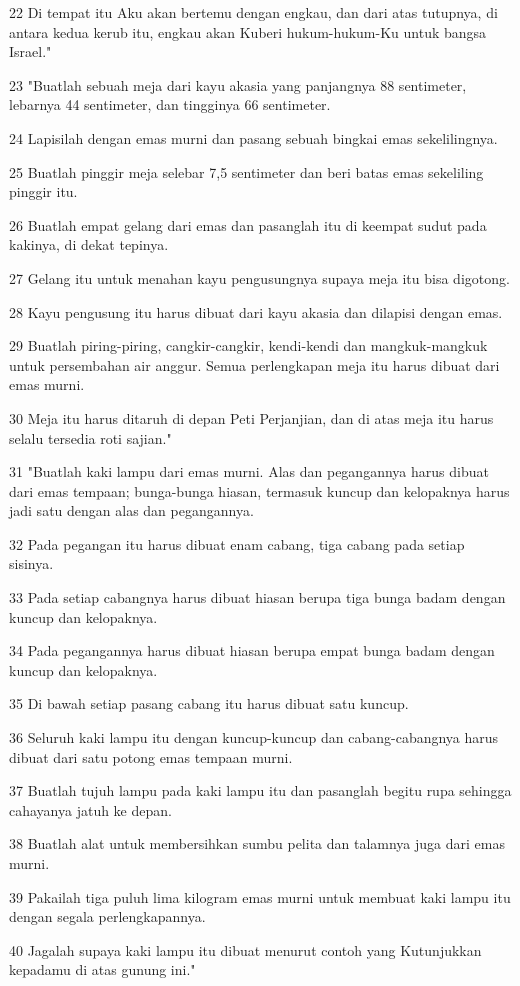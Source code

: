 \par 22 Di tempat itu Aku akan bertemu dengan engkau, dan dari atas tutupnya, di antara kedua kerub itu, engkau akan Kuberi hukum-hukum-Ku untuk bangsa Israel."
\par 23 "Buatlah sebuah meja dari kayu akasia yang panjangnya 88 sentimeter, lebarnya 44 sentimeter, dan tingginya 66 sentimeter.
\par 24 Lapisilah dengan emas murni dan pasang sebuah bingkai emas sekelilingnya.
\par 25 Buatlah pinggir meja selebar 7,5 sentimeter dan beri batas emas sekeliling pinggir itu.
\par 26 Buatlah empat gelang dari emas dan pasanglah itu di keempat sudut pada kakinya, di dekat tepinya.
\par 27 Gelang itu untuk menahan kayu pengusungnya supaya meja itu bisa digotong.
\par 28 Kayu pengusung itu harus dibuat dari kayu akasia dan dilapisi dengan emas.
\par 29 Buatlah piring-piring, cangkir-cangkir, kendi-kendi dan mangkuk-mangkuk untuk persembahan air anggur. Semua perlengkapan meja itu harus dibuat dari emas murni.
\par 30 Meja itu harus ditaruh di depan Peti Perjanjian, dan di atas meja itu harus selalu tersedia roti sajian."
\par 31 "Buatlah kaki lampu dari emas murni. Alas dan pegangannya harus dibuat dari emas tempaan; bunga-bunga hiasan, termasuk kuncup dan kelopaknya harus jadi satu dengan alas dan pegangannya.
\par 32 Pada pegangan itu harus dibuat enam cabang, tiga cabang pada setiap sisinya.
\par 33 Pada setiap cabangnya harus dibuat hiasan berupa tiga bunga badam dengan kuncup dan kelopaknya.
\par 34 Pada pegangannya harus dibuat hiasan berupa empat bunga badam dengan kuncup dan kelopaknya.
\par 35 Di bawah setiap pasang cabang itu harus dibuat satu kuncup.
\par 36 Seluruh kaki lampu itu dengan kuncup-kuncup dan cabang-cabangnya harus dibuat dari satu potong emas tempaan murni.
\par 37 Buatlah tujuh lampu pada kaki lampu itu dan pasanglah begitu rupa sehingga cahayanya jatuh ke depan.
\par 38 Buatlah alat untuk membersihkan sumbu pelita dan talamnya juga dari emas murni.
\par 39 Pakailah tiga puluh lima kilogram emas murni untuk membuat kaki lampu itu dengan segala perlengkapannya.
\par 40 Jagalah supaya kaki lampu itu dibuat menurut contoh yang Kutunjukkan kepadamu di atas gunung ini."

